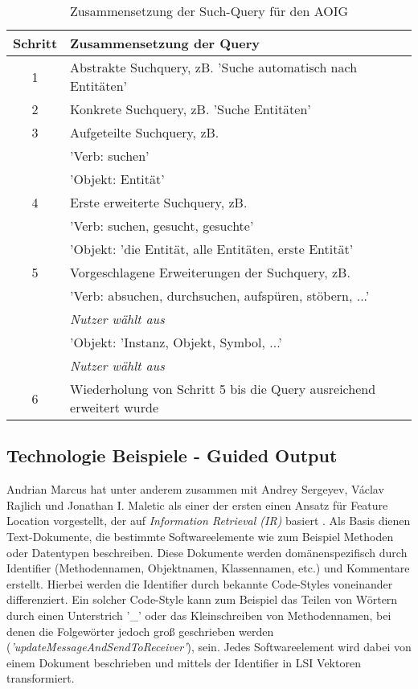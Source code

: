 \documentclass[runningheads,a4paper]{llncs}
\begin{document}
\begin{table}[h]
	\centering
	\begin{tabular}{|c|l|}
		\hline
		\hspace{0.1cm} \textbf{Schritt} \hspace{0.1cm} & \textbf{Zusammensetzung der Query}\\
		\hline
		1 & Abstrakte Suchquery, zB. 'Suche automatisch nach Entitäten'\\
		\hline
		2 & Konkrete Suchquery, zB. 'Suche Entitäten'\\
		\hline
		3 & Aufgeteilte Suchquery, zB.\\
		& 'Verb: suchen'\\
		& 'Objekt: Entität'\\
		\hline
		4 & Erste erweiterte Suchquery, zB.\\
		& 'Verb: suchen, gesucht, gesuchte'\\
		& 'Objekt: 'die Entität, alle Entitäten, erste Entität'\\
		\hline
		5 & Vorgeschlagene Erweiterungen der Suchquery, zB.\\
		& 'Verb: absuchen, durchsuchen, aufspüren, stöbern, ...'\\
		& \textit{Nutzer wählt aus}\\
		& 'Objekt: 'Instanz, Objekt, Symbol, ...'\\
		& \textit{Nutzer wählt aus}\\
		\hline
		6 & Wiederholung von Schritt 5 bis die Query ausreichend erweitert wurde\\
		\hline
	\end{tabular}
	\label{query}
	\vspace{0.2cm}
	\caption{Zusammensetzung der Such-Query für den AOIG}
\end{table}

\subsection*{Technologie Beispiele - Guided Output}

Andrian Marcus hat unter anderem zusammen mit Andrey Sergeyev, Václav Rajlich und Jonathan I. Maletic als einer der ersten einen Ansatz für Feature Location vorgestellt, der auf \textit{Information Retrieval (IR)} basiert \cite{marcus1}\cite{marcus2}. Als Basis dienen Text-Dokumente, die bestimmte Softwareelemente wie zum Beispiel Methoden oder Datentypen beschreiben. Diese Dokumente werden domänenspezifisch durch Identifier (Methodennamen, Objektnamen, Klassennamen, etc.) und Kommentare erstellt. Hierbei werden die Identifier durch bekannte Code-Styles voneinander differenziert. Ein solcher Code-Style kann zum Beispiel das Teilen von Wörtern durch einen Unterstrich '\_' oder das Kleinschreiben von Methodennamen, bei denen die Folgewörter jedoch groß geschrieben werden (\textit{'updateMessageAndSendToReceiver'}), sein. Jedes Softwareelement wird dabei von einem Dokument beschrieben und mittels der Identifier in LSI Vektoren transformiert.
\end{document}
